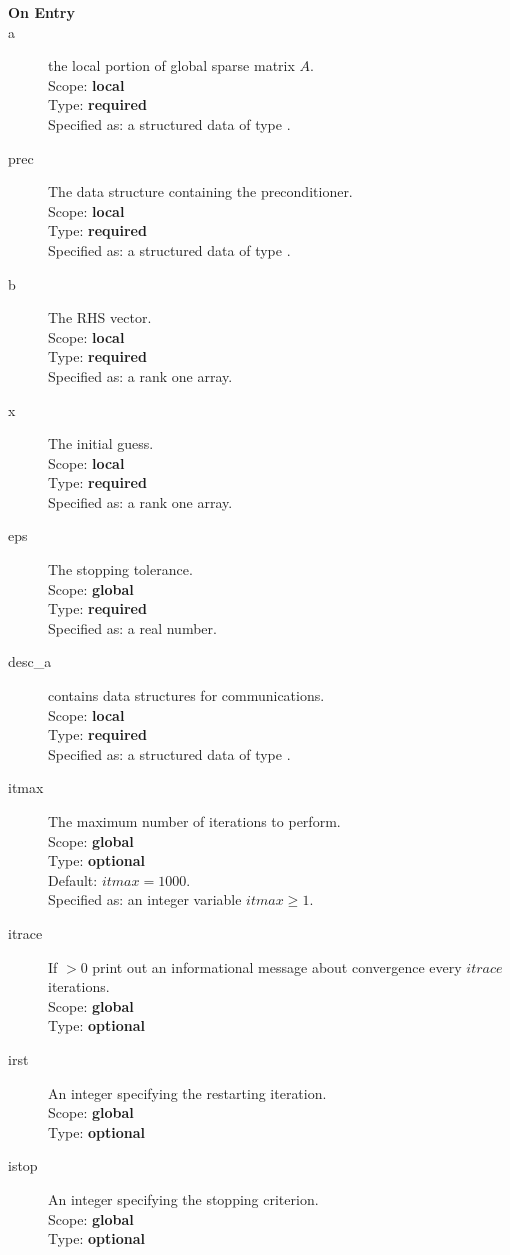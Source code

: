 \begin{description}
\item[\bf On Entry]
\item[a] the local portion of global sparse matrix
$A$. \\
Scope: {\bf local} \\
Type: {\bf required}\\
Specified as: a structured data of type \spdata.
\item[prec] The data structure containing the preconditioner.\\
Scope: {\bf local} \\
Type: {\bf required}\\
Specified as: a structured data of type \precdata.
\item[b] The RHS vector. \\
Scope: {\bf local} \\
Type: {\bf required}\\
Specified as: a rank one array.
\item[x] The initial guess. \\
Scope: {\bf local} \\
Type: {\bf required}\\
Specified as: a rank one array.
\item[eps] The stopping tolerance. \\
Scope: {\bf global} \\
Type: {\bf required}\\
Specified as: a real number. 
\item[desc\_a] contains data structures for communications.\\
Scope: {\bf local} \\
Type: {\bf required}\\
Specified as: a structured data of type \descdata.
\item[itmax]  The maximum number of iterations to perform.\\
Scope: {\bf global} \\
Type: {\bf optional}\\
Default: $itmax = 1000$.\\
Specified as: an integer variable $itmax \ge 1$.
\item[itrace]  If $>0$  print out an informational message about
  convergence  every $itrace$ iterations.\\ 
Scope: {\bf global} \\
Type: {\bf optional}\\
\item[irst]  An integer specifying the restarting iteration.\\
Scope: {\bf global} \\
Type: {\bf optional}\\
\item[istop]  An integer specifying the stopping criterion.\\
Scope: {\bf global} \\
Type: {\bf optional}\\


\end{description}
